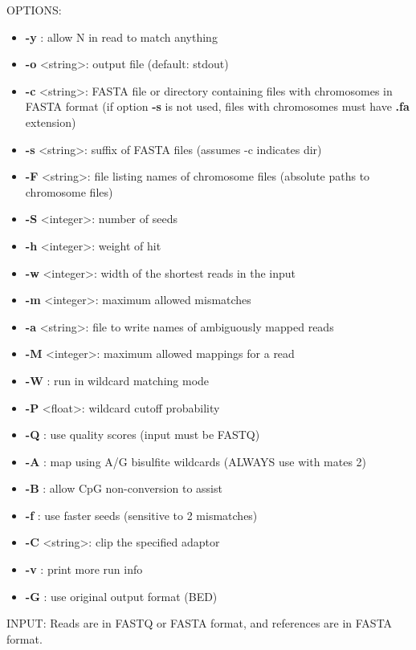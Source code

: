 \documentclass{article}
\begin{document}
OPTIONS:
\begin{itemize}
\item
\textbf{-y} : allow N in read to match anything
\item
\textbf{-o} \textless string\textgreater : output file (default: stdout)
\item
\textbf{-c} \textless string\textgreater : FASTA file or directory containing files with chromosomes in 
	FASTA format (if option \textbf{-s} is not used, files with chromosomes must have
	\textbf{.fa} extension) 
\item
\textbf{-s} \textless string\textgreater : suffix of FASTA files (assumes -c indicates dir) 
\item
\textbf{-F} \textless string\textgreater : file listing names of chromosome files (absolute paths to
	chromosome files) 
\item
\textbf{-S} \textless integer\textgreater : number of seeds 
\item
\textbf{-h} \textless integer\textgreater : weight of hit 
\item
\textbf{-w} \textless integer\textgreater : width of the shortest reads in the input
\item
\textbf{-m} \textless integer\textgreater : maximum allowed mismatches 
\item
\textbf{-a} \textless string\textgreater : file to write names of ambiguously mapped reads 
\item
\textbf{-M} \textless integer\textgreater :  maximum allowed mappings for a read 
\item
\textbf{-W} : run in wildcard matching mode 
\item
\textbf{-P} \textless float\textgreater : wildcard cutoff probability 
\item
\textbf{-Q} : use quality scores (input must be FASTQ) 
\item
\textbf{-A} : map using A/G bisulfite wildcards (ALWAYS use with mates 2) 
\item
\textbf{-B} : allow CpG non-conversion to assist 
\item
\textbf{-f} : use faster seeds (sensitive to 2 mismatches) 
\item
\textbf{-C} \textless string\textgreater : clip the specified adaptor 
\item
\textbf{-v} : print more run info 
\item
\textbf{-G} : use original output format (BED)
\end{itemize}

INPUT: Reads are in FASTQ or FASTA format, and references are in FASTA format.
\end{document}
